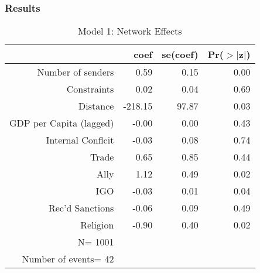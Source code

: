 \documentclass{beamer}
\begin{document}
\begin{frame}
\frametitle{Results}

%

\begin{table}[ht]
\caption{Model 1: Network Effects}
\begin{center}
\begin{tabular}{rrrr}
  \hline
 & coef & se(coef) & Pr($>$$|$z$|$) \\ 
  \hline
Number of senders & 0.59 & 0.15 & 0.00 \\ 
  Constraints & 0.02 & 0.04 & 0.69 \\ 
  Distance & -218.15 & 97.87 & 0.03 \\ 
  GDP per Capita (lagged) & -0.00 & 0.00 & 0.43 \\ 
  Internal Conflcit & -0.03 & 0.08 & 0.74 \\ 
  Trade & 0.65 & 0.85 & 0.44 \\ 
  Ally & 1.12 & 0.49 & 0.02 \\ 
  IGO & -0.03 & 0.01 & 0.04 \\ 
  Rec'd Sanctions & -0.06 & 0.09 & 0.49 \\ 
  Religion & -0.90 & 0.40 & 0.02 \\ 
   \hline
  N= 1001 &&& \\
  Number of events= 42 &&& \\
  \hline

\end{tabular}
\end{center}
\end{table}


\end{frame}

\end{document}

